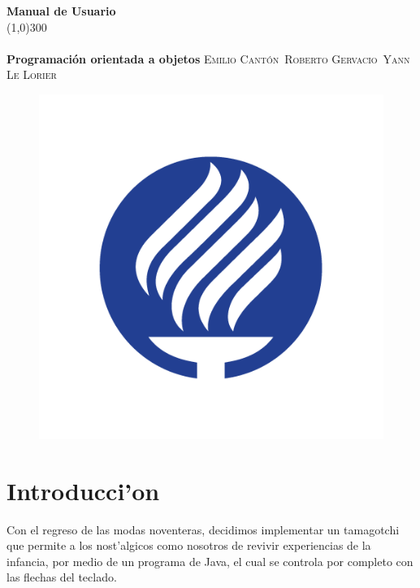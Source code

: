 \documentclass[12pt]{amsart}
\begin{document}
\begin{titlepage}
	\begin{center}	
	\huge{\bfseries{Manual de Usuario}}\\
	[0.1cm]
	\line(1,0){300}\\\\
	\huge{\bfseries{Programaci\'on orientada a objetos}}
	\textsc{\small{Emilio Cant\'on}}\
	\textsc{\small{Roberto Gervacio}}\
	\textsc{\small{Yann Le Lorier}}
	\begin{figure}
		\includegraphics[width=\linewidth]{images/Tec.jpg}
	\end{figure}
	
	\end{center}

\end{titlepage}

\tableofcontents

\section{Introducci'on}
\hspace{10mm}Con el regreso de las modas noventeras, decidimos implementar un tamagotchi que permite a los nost'algicos como nosotros de revivir experiencias de la infancia, por medio de un programa de Java, el cual se controla por completo con las flechas del teclado.
\end{document}
